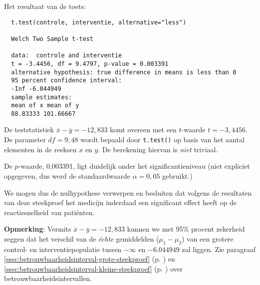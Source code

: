 \begin{example}
  Het resultaat van de toets:
  
  \begin{verbatim}
  t.test(controle, interventie, alternative="less")
  
  Welch Two Sample t-test
  
  data:  controle and interventie
  t = -3.4456, df = 9.4797, p-value = 0.003391
  alternative hypothesis: true difference in means is less than 0
  95 percent confidence interval:
  -Inf -6.044949
  sample estimates:
  mean of x mean of y 
  88.83333 101.66667
  \end{verbatim}
  
  De teststatistiek $\overline{x}-\overline{y}=-12,833$ komt overeen met een $t$-waarde $t=-3,4456$.
  De parameter $df=9,48$ wordt bepaald door \texttt{t.test()} op basis van
  het aantal elementen in de reeksen $x$ en $y$.
  De berekening hiervan is \textit{niet} triviaal.
  
  De $p$-waarde, 0,003391, ligt duidelijk onder het significantieniveau (niet expliciet opgegeven, dus werd de standaardwaarde $\alpha = 0,05$ gebruikt.)
  
  We mogen dus de nulhypothese verwerpen en besluiten dat volgens de resultaten van deze steekproef het medicijn inderdaad een significant effect heeft op de reactiesnelheid van patiënten.
  
  \textbf{Opmerking}: Vermits $\overline{x}-\overline{y}=-12,833$
  kunnen we met 95\% procent zekerheid zeggen dat het verschil van de \textit{\'echte} gemiddelden ($\mu_1-\mu_2$)
  van een grotere control- en interventiepopulatie tussen $-\infty$ en $-6.044949$ zal liggen.
  Zie paragraaf \ref{ssec:betrouwbaarheidsinterval-grote-steekproef} (p. \pageref{ssec:betrouwbaarheidsinterval-grote-steekproef})
  en \ref{ssec:betrouwbaarheidsinterval-kleine-steekproef} (p. \pageref{ssec:betrouwbaarheidsinterval-kleine-steekproef})
  over betrouwbaarheidsintervallen.
\end{example}

